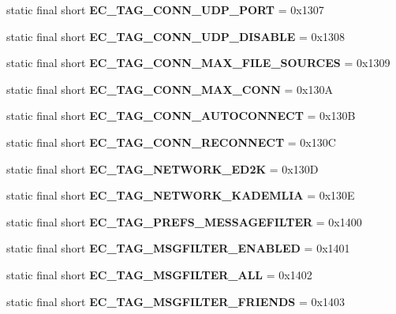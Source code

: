 \begin{DoxyCompactItemize}
\item 
static final short {\bfseries EC\_\-TAG\_\-CONN\_\-UDP\_\-PORT} = 0x1307\label{interfaceECCodes_afd34c42e0bd2e714b8e8b8fdc1a8fa3c}

\item 
static final short {\bfseries EC\_\-TAG\_\-CONN\_\-UDP\_\-DISABLE} = 0x1308\label{interfaceECCodes_ac2c1800b8cfbd246aa1d6c21937bacca}

\item 
static final short {\bfseries EC\_\-TAG\_\-CONN\_\-MAX\_\-FILE\_\-SOURCES} = 0x1309\label{interfaceECCodes_a184bc040873298e9481966aac44fcb06}

\item 
static final short {\bfseries EC\_\-TAG\_\-CONN\_\-MAX\_\-CONN} = 0x130A\label{interfaceECCodes_adac4d67ee1e4865688293ede8cd60690}

\item 
static final short {\bfseries EC\_\-TAG\_\-CONN\_\-AUTOCONNECT} = 0x130B\label{interfaceECCodes_ab1da8ca761db9a01c042821d447b88e6}

\item 
static final short {\bfseries EC\_\-TAG\_\-CONN\_\-RECONNECT} = 0x130C\label{interfaceECCodes_a558fd3595027238fb85f02ce8e1cb3ac}

\item 
static final short {\bfseries EC\_\-TAG\_\-NETWORK\_\-ED2K} = 0x130D\label{interfaceECCodes_a5e09dd39ca2341a2e655ca0fce7d2603}

\item 
static final short {\bfseries EC\_\-TAG\_\-NETWORK\_\-KADEMLIA} = 0x130E\label{interfaceECCodes_a4029487d3a285fa8e6a1d626f01cd65c}

\item 
static final short {\bfseries EC\_\-TAG\_\-PREFS\_\-MESSAGEFILTER} = 0x1400\label{interfaceECCodes_aa87404c00714d83240c898ecca90f819}

\item 
static final short {\bfseries EC\_\-TAG\_\-MSGFILTER\_\-ENABLED} = 0x1401\label{interfaceECCodes_a52c5bc181580a0582d0b80b902320796}

\item 
static final short {\bfseries EC\_\-TAG\_\-MSGFILTER\_\-ALL} = 0x1402\label{interfaceECCodes_a288054a7246cb90e6634622501ecf995}

\item 
static final short {\bfseries EC\_\-TAG\_\-MSGFILTER\_\-FRIENDS} = 0x1403\label{interfaceECCodes_a673ac40075816e09fdcf35860d0eedce}


\end{DoxyCompactItemize}
